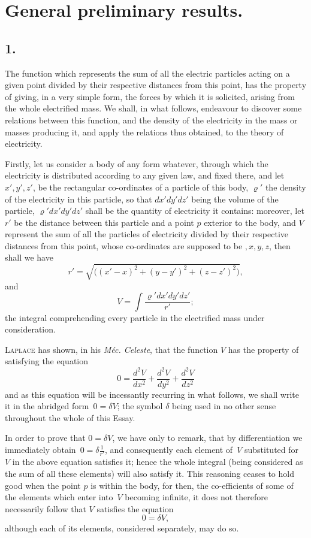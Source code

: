 \documentclass[12pt,notitlepage]{amsart}
\let\Person\textsc
\let\Title\textit
\newcommand\Section[1]{\subsection{{#1}}}
\renewcommand{\rho}{\varrho}
\begin{document}
\section{General preliminary results.}
\Section{1.}
The function which represents the sum of all the electric particles
acting on a given point divided by their respective distances from this point,
has the property of giving, in a very simple form, the forces by which it is
solicited, arising from the whole electrified mass. We shall, in what follows,
endeavour to discover some relations between this function, and the density
of the electricity in the mass or masses producing it, and apply the relations
thus obtained, to the theory of electricity.

Firstly, let us consider a body of any form whatever, through which
the electricity is distributed according to any given law, and fixed there, and
let $x',y',z'$, be the rectangular co-ordinates of a particle of this body,
$\rho'$
the density of the electricity in this particle,
so that $dx'dy'dz'$ being the volume of the particle,
$\rho'dx'dy'dz'$ shall be the quantity of electricity it contains:
moreover, let $r'$ be the distance between this particle and a point $p$
exterior to the body, and $V$ represent the sum of all the particles of
electricity divided by their respective distances from this point,
whose co-ordinates are supposed to be $,x,y,z$, then shall we have
\[
r'=\sqrt{\bigl((x'-x)^2+(y-y')^2+(z-z')^2\bigr)},
\]
and
\[
V=\int\frac{\rho'dx'dy'dz'}{r'};
\]
the integral comprehending every particle in the electrified mass under 
consideration.

\Person{Laplace} has shown, in his \Title{M\'ec. Celeste},
that the function $V$ has the
property of satisfying the equation
\[
0=\frac{d^2V}{dx^2}+\frac{d^2V}{dy^2}+\frac{d^2V}{dz^2}
\]
and as this equation will be incessantly recurring in what follows, we shall
write it in the abridged form~${0=\delta V}$;
the symbol $\delta$ being used in no other
sense throughout the whole of this Essay.

In order to prove that $0=\delta V$, we have only to remark, that by
differentiation we immediately obtain~$0=\delta\frac{1}{r'}$,
and consequently each element of~$V$ substituted for~$V$
in the above equation satisfies it; hence the
whole integral (being considered as the sum of all these elements) will also
satisfy it. This reasoning ceases to hold good when the point $p$ is within
the body, for then, the co-efficients of some of the elements which enter
into~$V$ becoming infinite,
it does not therefore necessarily follow that $V$ satisfies the equation
\[
0=\delta V,
\]
although each of its elements, considered separately, may do so.
\end{document}
